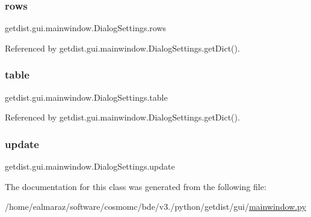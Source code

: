 \subsubsection{\texorpdfstring{rows}{rows}}
{\footnotesize\ttfamily getdist.\+gui.\+mainwindow.\+Dialog\+Settings.\+rows}



Referenced by getdist.\+gui.\+mainwindow.\+Dialog\+Settings.\+get\+Dict().

\mbox{\label{classgetdist_1_1gui_1_1mainwindow_1_1DialogSettings_a2693087d5c876d3182d36725a8f32910}} 
\subsubsection{\texorpdfstring{table}{table}}
{\footnotesize\ttfamily getdist.\+gui.\+mainwindow.\+Dialog\+Settings.\+table}



Referenced by getdist.\+gui.\+mainwindow.\+Dialog\+Settings.\+get\+Dict().

\mbox{\label{classgetdist_1_1gui_1_1mainwindow_1_1DialogSettings_a6e90f00bde0b695ea4597b5b6bd41d46}} 
\subsubsection{\texorpdfstring{update}{update}}
{\footnotesize\ttfamily getdist.\+gui.\+mainwindow.\+Dialog\+Settings.\+update}



The documentation for this class was generated from the following file\+:\begin{DoxyCompactItemize}
\item 
/home/ealmaraz/software/cosmomc/bde/v3./python/getdist/gui/\mbox{\hyperlink{mainwindow_8py}{mainwindow.\+py}}\end{DoxyCompactItemize}
